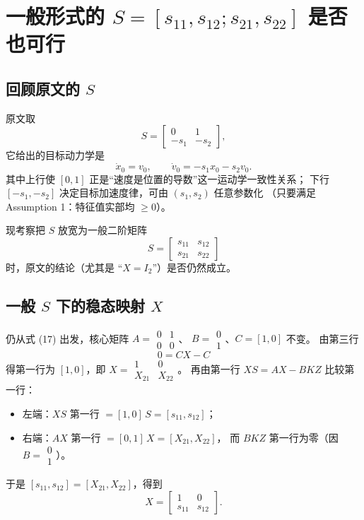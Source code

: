 
\section{一般形式的 $S=[s_{11},s_{12};s_{21},s_{22}]$ 是否也可行}

\subsection{回顾原文的 $S$}

原文取
\[
S = \begin{bmatrix}0&1\\-s_1&-s_2\end{bmatrix},
\]
它给出的目标动力学是
\[
\dot x_0 = v_0,\qquad \dot v_0 = -s_1 x_0 - s_2 v_0.
\]
其中上行使 $[0,1]$ 正是“速度是位置的导数”这一运动学一致性关系；
下行 $[-s_1,-s_2]$ 决定目标加速度律，可由 $(s_1,s_2)$ 任意参数化
（只要满足 Assumption 1：特征值实部均 $\ge 0$）。

现考察把 $S$ 放宽为一般二阶矩阵
\[
S = \begin{bmatrix}s_{11}&s_{12}\\ s_{21}&s_{22}\end{bmatrix}
\]
时，原文的结论（尤其是 “$X=I_2$”）是否仍然成立。

\subsection{一般 $S$ 下的稳态映射 $X$}

仍从式 (17) 出发，核心矩阵 $A=\begin{smallmatrix}0&1\\0&0\end{smallmatrix}$、
$B=\begin{smallmatrix}0\\1\end{smallmatrix}$、$C=[1,0]$ 不变。
由第三行
\[
0 = CX - C
\]
得第一行为 $[1,0]$，即 $X=\begin{smallmatrix}1&0\\X_{21}&X_{22}\end{smallmatrix}$。
再由第一行 $XS = AX - BKZ$ 比较第一行：
\begin{itemize}
  \item 左端：$XS$ 第一行 $= [1,0]\,S = [s_{11},s_{12}]$；
  \item 右端：$AX$ 第一行 $= [0,1]\,X = [X_{21},X_{22}]$，
    而 $BKZ$ 第一行为零（因 $B=\begin{smallmatrix}0\\1\end{smallmatrix}$）。
\end{itemize}
于是 $[s_{11},s_{12}] = [X_{21},X_{22}]$，得到
\[
X = \begin{bmatrix}1&0\\ s_{11}&s_{12}\end{bmatrix}.
\]

